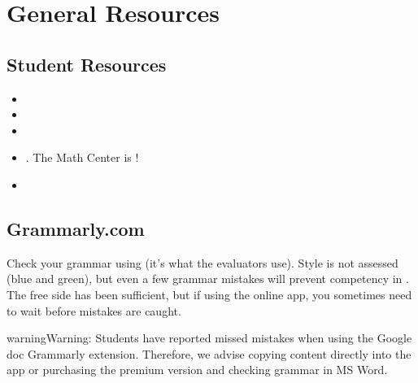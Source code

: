 \documentclass[letterpaper,10pt,english]{jupyterBook}
\begin{document}
\section{General Resources}
\label{\detokenize{resources:general-resources}}

\subsection{Student Resources}
\label{\detokenize{resources:student-resources}}\label{\detokenize{resources:resources-gen-student-resources}}\begin{itemize}
\item {} 
\sphinxAtStartPar
{}

\item {} 
\sphinxAtStartPar
{}

\item {} 
\sphinxAtStartPar
{}

\item {} 
\sphinxAtStartPar
{}. The Math Center is !

\item {} 
\sphinxAtStartPar
{}

\end{itemize}


\subsection{Grammarly.com}
\label{\detokenize{resources:grammarly-com}}\label{\detokenize{resources:resources-gen-grammarly}}
\sphinxAtStartPar
Check your grammar using   (it’s what the evaluators use). Style is not assessed (blue and green), but even a few grammar mistakes will prevent competency in . The free side has been sufficient, but if using the online app, you sometimes need to wait before mistakes are caught.

\begin{sphinxadmonition}{warning}{Warning:}
\sphinxAtStartPar
Students have reported missed mistakes when using the Google doc Grammarly extension. Therefore, we advise copying content directly into the app or purchasing the premium version and checking grammar in MS Word.
\end{sphinxadmonition}
\end{document}
